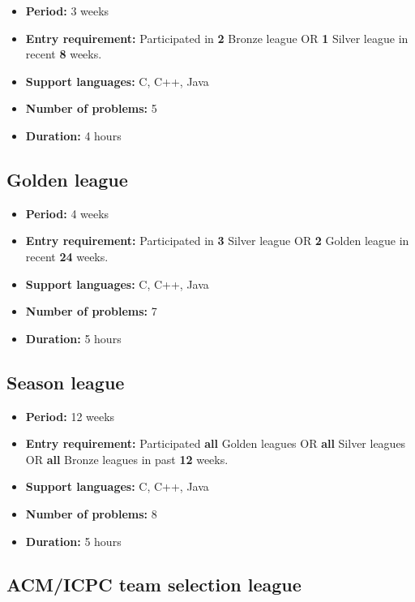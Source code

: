 \documentclass{article}
\begin{document}
\begin{itemize}
	\item \textbf{Period:} 3 weeks
	\item \textbf{Entry requirement:} Participated in \textbf{2} Bronze league OR \textbf{1} Silver league in recent \textbf{8} weeks.
	\item \textbf{Support languages:} C, C++, Java
	\item \textbf{Number of problems:} 5
	\item \textbf{Duration:} 4 hours
\end{itemize}

\subsection{Golden league}

\begin{itemize}
	\item \textbf{Period:} 4 weeks
	\item \textbf{Entry requirement:} Participated in \textbf{3} Silver league OR \textbf{2} Golden league in recent \textbf{24} weeks.
	\item \textbf{Support languages:} C, C++, Java
	\item \textbf{Number of problems:} 7
	\item \textbf{Duration:} 5 hours
\end{itemize}

\subsection{Season league}

\begin{itemize}
	\item \textbf{Period:} 12 weeks
	\item \textbf{Entry requirement:} Participated \textbf{all} Golden leagues OR \textbf{all} Silver leagues OR \textbf{all} Bronze leagues in past \textbf{12} weeks.
	\item \textbf{Support languages:} C, C++, Java
	\item \textbf{Number of problems:} 8
	\item \textbf{Duration:} 5 hours
\end{itemize}

\subsection{ACM/ICPC team selection league}
\end{document}
